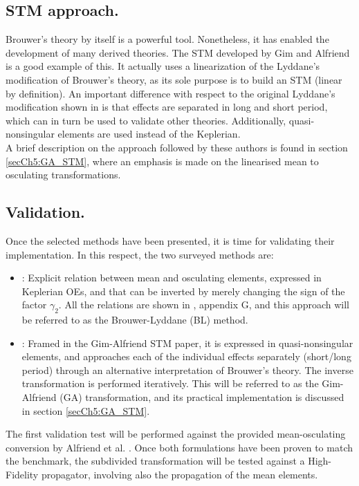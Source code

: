 	\subsection{STM approach.}
	\indent Brouwer's theory by itself is a powerful tool. Nonetheless, it has enabled the development of many derived theories. The STM developed by Gim and Alfriend \cite{GA_STM} is a good example of this. It actually uses a linearization of the Lyddane's modification of Brouwer's theory, as its sole purpose is to build an STM (linear by definition). An important difference with respect to the original Lyddane's modification shown in \cite{Schaub_Junkins} is that effects are separated in long and short period, which can in turn be used to validate other theories. Additionally, quasi-nonsingular elements are used instead of the Keplerian.\\
	\indent A brief description on the approach followed by these authors is found in section \ref{secCh5:GA_STM}, where an emphasis is made on the linearised mean to osculating transformations.
	\subsection{Validation.}
	\indent Once the selected methods have been presented, it is time for validating their implementation. In this respect, the two surveyed methods are:
	\begin{itemize}
	\item[\GMVred{A.}] : Explicit relation between mean and osculating elements, expressed in Keplerian OEs, and that can be inverted by merely changing the sign of the factor $\gamma_2$. All the relations are shown in \cite{Schaub_Junkins}, appendix G, and this approach will be referred to as the Brouwer-Lyddane (BL) method.
	\item[\GMVred{B.}] : Framed in the Gim-Alfriend STM paper, it is expressed in quasi-nonsingular elements, and approaches each of the individual effects separately (short/long period) through an alternative interpretation of Brouwer's theory. The inverse transformation is performed iteratively. This will be referred to as the Gim-Alfriend (GA) transformation, and its practical implementation is discussed in section \ref{secCh5:GA_STM}.
	\end{itemize}
	\indent The first validation test will be performed against the provided mean-osculating conversion by Alfriend et al. \cite[][section 3.4]{SCFormationFlying}. Once both formulations have been proven to match the benchmark, the subdivided transformation will be tested against a High-Fidelity propagator, involving also the propagation of the mean elements. 

